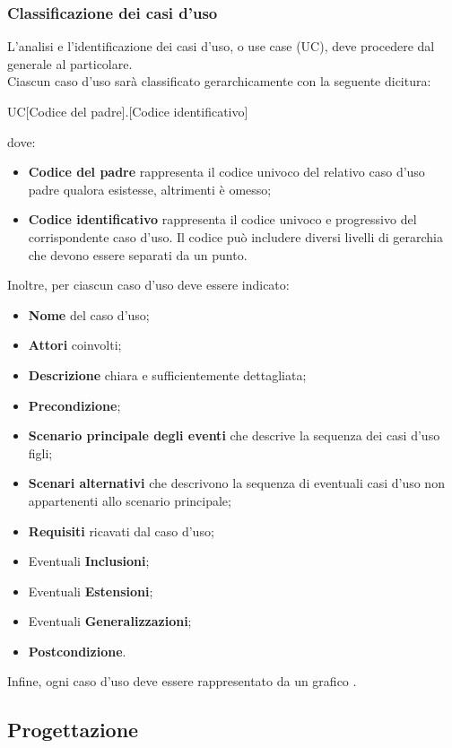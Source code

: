 \documentclass[../NormeDiProgetto.tex]{subfiles}
\begin{document}
			\subsubsection{Classificazione dei casi d'uso}
				L'analisi e l'identificazione dei casi d'uso, o use case (UC), deve
				procedere dal generale al particolare.\\
				Ciascun caso d'uso sarà classificato gerarchicamente con la seguente dicitura:
				\begin{center}
					UC[Codice del padre].[Codice identificativo]
				\end{center}
				dove:
				\begin{itemize}
					\item \textbf{Codice del padre} rappresenta il codice univoco
					del relativo caso d'uso padre qualora esistesse, altrimenti è omesso;
					\item \textbf{Codice identificativo} rappresenta il codice
					univoco e progressivo del corrispondente caso d'uso. Il codice
					può includere diversi livelli di gerarchia che devono essere
					separati da un punto.
				\end{itemize}
				Inoltre, per ciascun caso d'uso deve essere indicato:
				\begin{itemize}
					\item \textbf{Nome} del caso d'uso;
					\item \textbf{Attori} coinvolti;
					\item \textbf{Descrizione} chiara e sufficientemente
					dettagliata;
					\item \textbf{Precondizione};
					\item \textbf{Scenario principale degli eventi} che descrive
					la sequenza dei casi d'uso figli;
					\item \textbf{Scenari alternativi} che descrivono la sequenza
					di eventuali casi d'uso non appartenenti allo scenario
					principale;
					\item \textbf{Requisiti} ricavati dal caso d'uso;
					\item Eventuali \textbf{Inclusioni};
					\item Eventuali \textbf{Estensioni};
					\item Eventuali \textbf{Generalizzazioni};
					\item \textbf{Postcondizione}.
				\end{itemize}
				Infine, ogni caso d'uso deve essere rappresentato da un grafico .
		\subsection{Progettazione}
\end{document}
